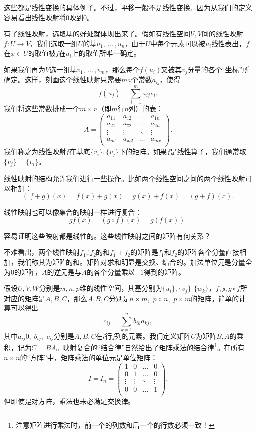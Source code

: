 这些都是线性变换的具体例子。不过，平移一般不是线性变换，因为从我们的定义容易看出线性映射将$0$映到$0$。

有了线性映射，选取基的好处就体现出来了。假如有线性空间$U,V$间的线性映射$f:U\to V$，我们选取一组$U$的基$u_1,\,\dots\,,u_n$，由于$U$中每个元素可以被$u_i$线性表出，$f$在$x\in U$的取值被$f$在$u_i$上的取值所唯一确定。

如果我们再为$V$选一组基$v_1,\,\dots\,,v_m$，那么每个$f(u_i)$又被其$v_j$分量的各个“坐标”所确定。这样，刻画这个线性映射只需要$mn$个常数$a_{ij}$，使得
\[f(u_j)=\sum_{i=1}^ma_{ij}v_i.\]
我们将这些常数排成一个$m\times n$（即$m$行$n$列）的表：
\[ A =
    \begin{pmatrix}
        a_{11} & a_{12} & \ldots & a_{1n} \\
        a_{21} & a_{22} & \ldots & a_{2n} \\
        \vdots & \vdots & \ddots & \vdots \\
        a_{m1} & a_{m2} & \ldots & a_{mn} \\
    \end{pmatrix} . \]
我们称之为线性映射$f$在基底$\{u_i\},\{v_j\}$下的矩阵。如果$f$是线性算子，我们通常取$\{v_j\}=\{u_i\}$。

线性映射的结构允许我们进行一些操作。比如两个线性空间之间的两个线性映射可以相加：\[(\;\!f+g)(x)=f(x)+g(x)=g(x)+f(x)=(g+f)(x).\]

线性映射也可以像集合的映射一样进行复合：
\[gf(x)=(g\circ f)(x)=g(f(x)).\]

容易证明这些映射都是线性的。这些线性映射之间的矩阵有何关系？

不难看出，两个线性映射$f_1$,!$f_2$的和$f_1+f_2$的矩阵是$f_1$和$f_2$的矩阵各个分量直接相加，我们称其为矩阵的和。矩阵对求和明显是交换、结合的。加法单位元是分量全为$0$的矩阵，$A$的逆元是与$A$的各个分量乘以$-1$得到的矩阵。

假设$U,V,W$分别是$m,n,p$维的线性空间，其基分别为$\{u_i\},\{v_j\},\{w_k\}$，$f,g,g\circ f$所对应的矩阵是$A,B,C$，那么$A,B,C$分别是$n\times m$,~$p\times n$,~$p\times m$的矩阵。简单的计算可以得出
\[c_{ij}=\sum_{k=1}^nb_{ik}a_{kj},\]
其中$a_{ij}$0,~$b_{ij}$,~$c_{ij}$分别是$A,B,C$在$i$行$j$列的元素。我们定义矩阵$C$为矩阵$B,A$的乘积，记为$C=BA$。映射复合的“结合律”自然给出了矩阵乘法的结合律\footnote{注意矩阵进行乘法时，前一个的列数和后一个的行数必须一致！}。在所有$n\times n$的“方阵”中，矩阵乘法的单位元是单位矩阵：
\[I=I_n=\begin{pmatrix}
        1      & 0      & \ldots & 0      \\
        0      & 1      & \ldots & 0      \\
        \vdots & \vdots & \ddots & \vdots \\
        0      & 0      & \ldots & 1      \\\end{pmatrix}.\]
但即使是对方阵，乘法也未必满足交换律。

